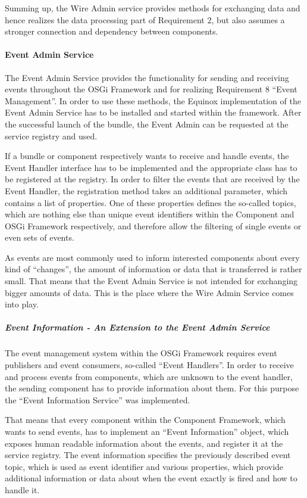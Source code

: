Summing up, the Wire Admin service provides methods for exchanging data and hence realizes the
data processing part of Requirement 2, but also assumes a stronger connection and dependency between
components.

\paragraph{Event Admin Service}
\label{sec:event_admin}
The Event Admin Service provides the functionality for sending and receiving events throughout the
OSGi Framework and for realizing Requirement 8 ``Event Management''. In order to use these methods,
the Equinox implementation of the Event Admin Service has to be installed and started within the
framework. After the successful launch of the bundle, the Event Admin can be requested at the
service registry and used.

If a bundle or component respectively wants to receive and handle events, the Event Handler interface
has to be implemented and the appropriate class has to be registered at the registry. In order to
filter the events that are received by the Event Handler, the registration method takes an additional
parameter, which contains a list of properties. One of these properties defines the so-called topics,
which are nothing else than unique event identifiers within the Component and OSGi Framework
respectively, and therefore allow the filtering of single events or even sets of events.

As events are most commonly used to inform interested components about every kind of ``changes'', the
amount of information or data that is transferred is rather small. That means that the Event Admin
Service is not intended for exchanging bigger amounts of data. This is the place where the Wire Admin
Service comes into play.

\subparagraph{Event Information - An Extension to the Event Admin Service}
The event management system within the OSGi Framework requires event publishers and event
consumers, so-called ``Event Handlers''. In order to receive and process events from components,
which are unknown to the event handler, the sending component has to provide information about
them. For this purpose the ``Event Information Service'' was implemented.

That means that every component within the Component Framework, which wants to send events, has to
implement an ``Event Information'' object, which exposes human readable information about the
events, and register it at the service registry. The event information specifies the previously
described event topic, which is used as event identifier and various properties, which provide
additional information or data about when the event exactly is fired and how to handle it.

